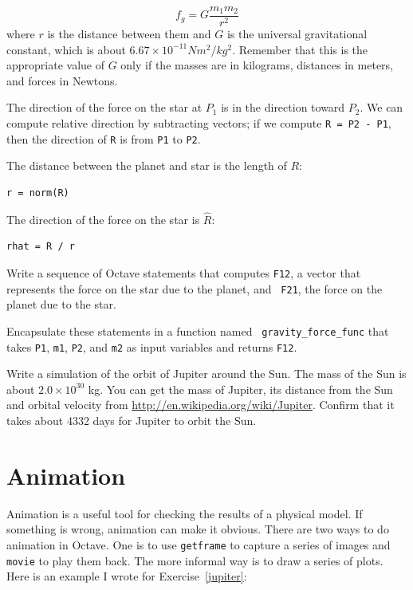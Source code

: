 \documentclass{book}
\begin{document}
\[ f_g = G \frac{m_1 m_2}{r^2} \]
%
where $r$ is the distance between them and $G$ is the universal
gravitational constant, which is about $6.67 \times 10^{-11} N m^2 /
kg^2$. Remember that this is the appropriate value of $G$ only if the
masses are in kilograms, distances in meters, and forces in Newtons.

The direction of the force on the star at $P_1$ is in the
direction toward $P_2$. We can compute relative direction by
subtracting vectors; if we compute {\tt R = P2 - P1}, then
the direction of {\tt R} is from {\tt P1} to {\tt P2}.

The distance between the planet and star is the length of $R$:

\begin{verbatim}
r = norm(R)
\end{verbatim}

The direction of the force on the star is $\hat{R}$:

\begin{verbatim}
rhat = R / r
\end{verbatim}

\begin{ex}
Write a sequence of Octave statements that computes {\tt F12}, a vector
that represents the force on the star due to the planet, and {\tt
F21}, the force on the planet due to the star.
\end{ex}

\begin{ex}
Encapsulate these statements in a function named {\tt
gravity\_force\_func} that takes {\tt P1}, {\tt m1}, {\tt P2}, and
{\tt m2} as input variables and returns {\tt F12}.
\end{ex}

\begin{ex}
\label{jupiter}
Write a simulation of the orbit of Jupiter around the Sun. The mass
of the Sun is about $2.0 \times 10^{30}$ kg. You can get the mass of
Jupiter, its distance from the Sun and orbital velocity from
\url{http://en.wikipedia.org/wiki/Jupiter}. Confirm that it takes
about 4332 days for Jupiter to orbit the Sun.
\end{ex}

\section{Animation}

Animation is a useful tool for checking the results of a physical
model. If something is wrong, animation can make it obvious.
There are two ways to do animation in Octave. One is to use
{\tt getframe} to capture a series of images and {\tt movie} to
play them back.
The more informal way is to draw a series of plots.
Here is an example I wrote for Exercise~\ref{jupiter}:
\end{document}
